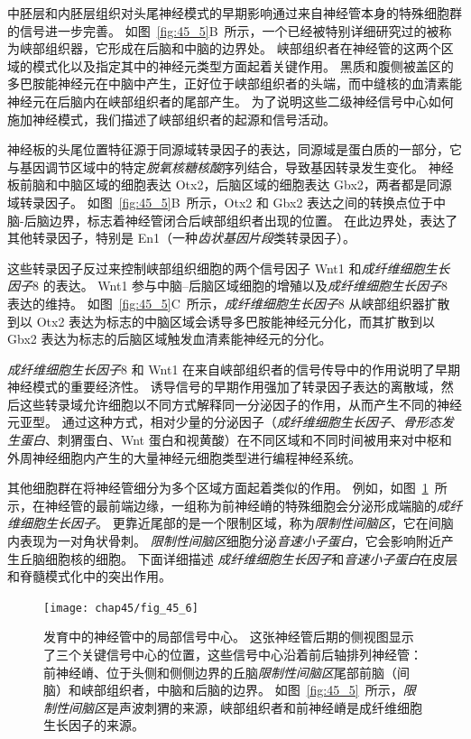 中胚层和内胚层组织对头尾神经模式的早期影响通过来自神经管本身的特殊细胞群的信号进一步完善。
如图~\ref{fig:45_5}B~所示，一个已经被特别详细研究过的被称为峡部组织器，它形成在后脑和中脑的边界处。
峡部组织者在神经管的这两个区域的模式化以及指定其中的神经元类型方面起着关键作用。
黑质和腹侧被盖区的多巴胺能神经元在中脑中产生，正好位于峡部组织者的头端，而中缝核的血清素能神经元在后脑内在峡部组织者的尾部产生。
为了说明这些二级神经信号中心如何施加神经模式，我们描述了峡部组织者的起源和信号活动。


神经板的头尾位置特征源于同源域转录因子的表达，同源域是蛋白质的一部分，它与基因调节区域中的特定\textit{脱氧核糖核酸}序列结合，导致基因转录发生变化。
神经板前脑和中脑区域的细胞表达 Otx2，后脑区域的细胞表达 Gbx2，两者都是同源域转录因子。
如图~\ref{fig:45_5}B~所示，Otx2 和 Gbx2 表达之间的转换点位于中脑-后脑边界，标志着神经管闭合后峡部组织者出现的位置。
在此边界处，表达了其他转录因子，特别是 En1（一种\textit{齿状基因片段}类转录因子）。


这些转录因子反过来控制峡部组织细胞的两个信号因子 Wnt1 和\textit{成纤维细胞生长因子}8 的表达。
Wnt1 参与中脑--后脑区域细胞的增殖以及\textit{成纤维细胞生长因子}8 表达的维持。
如图~\ref{fig:45_5}C~所示，\textit{成纤维细胞生长因子}8 从峡部组织器扩散到以 Otx2 表达为标志的中脑区域会诱导多巴胺能神经元分化，而其扩散到以 Gbx2 表达为标志的后脑区域触发血清素能神经元的分化。


\textit{成纤维细胞生长因子}8 和 Wnt1 在来自峡部组织者的信号传导中的作用说明了早期神经模式的重要经济性。
诱导信号的早期作用强加了转录因子表达的离散域，然后这些转录域允许细胞以不同方式解释同一分泌因子的作用，从而产生不同的神经元亚型。
通过这种方式，相对少量的分泌因子（\textit{成纤维细胞生长因子}、\textit{骨形态发生蛋白}、刺猬蛋白、Wnt 蛋白和视黄酸）在不同区域和不同时间被用来对中枢和外周神经细胞内产生的大量神经元细胞类型进行编程神经系统。


其他细胞群在将神经管细分为多个区域方面起着类似的作用。
例如，如图~\ref{fig:45_6}~所示，在神经管的最前端边缘，一组称为前神经嵴的特殊细胞会分泌形成端脑的\textit{成纤维细胞生长因子}。
更靠近尾部的是一个限制区域，称为\textit{限制性间脑区}，它在间脑内表现为一对角状骨刺。
\textit{限制性间脑区}细胞分泌\textit{音速小子蛋白}，它会影响附近产生丘脑细胞核的细胞。
下面详细描述 \textit{成纤维细胞生长因子}和\textit{音速小子蛋白}在皮层和脊髓模式化中的突出作用。


\begin{figure}[htbp]
	\centering
	\texttt{[image: chap45/fig\_45\_6]}
	\caption{发育中的神经管中的局部信号中心。
		这张神经管后期的侧视图显示了三个关键信号中心的位置，这些信号中心沿着前后轴排列神经管：
		前神经嵴、位于头侧和侧侧边界的丘脑\textit{限制性间脑区}尾部前脑（间脑）和峡部组织者，中脑和后脑的边界。
		如图~\ref{fig:45_5}~所示，\textit{限制性间脑区}是声波刺猬的来源，峡部组织者和前神经嵴是成纤维细胞生长因子的来源。}
	\label{fig:45_6}
\end{figure}



